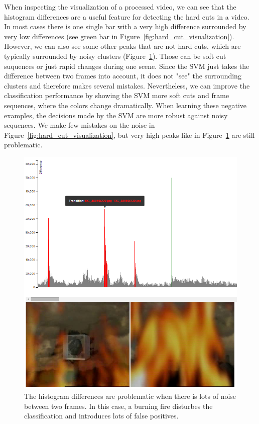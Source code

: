 When inspecting the visualization of a processed video, we can see that the histogram differences are a useful feature for detecting the hard cuts in a video.
In most cases there is one single bar with a very high difference surrounded by very low differences (see green bar in Figure~\ref{fig:hard_cut_visualization}).
However, we can also see some other peaks that are not hard cuts, which are typically surrounded by noisy clusters (Figure~\ref{fig:hard_cut_noise_visualization}).
Those can be soft cut suquences or just rapid changes during one scene.
Since the SVM just takes the difference between two frames into account, it does not "see" the surrounding clusters and therefore makes several mistakes.
Nevertheless, we can improve the classification performance by showing the SVM more soft cuts and frame sequences, where the colors change dramatically.
When learning these negative examples, the decisions made by the SVM are more robust against noisy sequences.
We make few mistakes on the noise in Figure~\ref{fig:hard_cut_visualization}, but very high peaks like in Figure~\ref{fig:hard_cut_noise_visualization} are still problematic.

\begin{figure}
	\centering
	\includegraphics[scale=.7]{images/hard_cut_noise_visualization.png}
	\caption{The histogram differences are problematic when there is lots of noise between two frames. In this case, a burning fire disturbes the classification and introduces lots of false positives.}
	\label{fig:hard_cut_noise_visualization}
\end{figure}